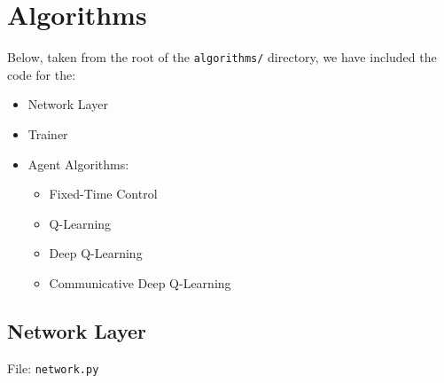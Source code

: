 \documentclass[a4paper]{report}
\begin{document}
\section{Algorithms}

Below, taken from the root of the \texttt{algorithms/} directory, we have included the code for the:
\begin{itemize}
    \item Network Layer
    \item Trainer
    \item Agent Algorithms:
    \begin{itemize}
      \item Fixed-Time Control
      \item Q-Learning
      \item Deep Q-Learning
      \item Communicative Deep Q-Learning
  \end{itemize}
\end{itemize}

\subsection{Network Layer}

File: \texttt{network.py}
\end{document}
